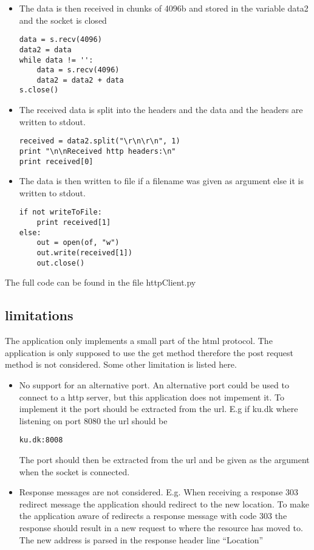\documentclass[a4paper,12pt,danish]{dnacm} %
\begin{document}
\begin{itemize}
  \item The data is then received in chunks of 4096b and stored in the variable
  data2 and the socket is closed
\begin{lstlisting}
data = s.recv(4096)
data2 = data
while data != '':
	data = s.recv(4096)
	data2 = data2 + data
s.close()
\end{lstlisting}  
  \item The received data is split into the headers and the data and the headers
  are written to stdout.
\begin{lstlisting}
received = data2.split("\r\n\r\n", 1)
print "\n\nReceived http headers:\n"
print received[0]
\end{lstlisting}  
  \item The data is then written to file if a filename was given as argument else
  it is written to stdout.
\begin{lstlisting}
if not writeToFile:
	print received[1]
else:
	out = open(of, "w")
	out.write(received[1])
	out.close()
\end{lstlisting}  
\end{itemize}

The full code can be found in the file httpClient.py
\subsection{limitations}
The application only implements a small part of the html protocol. The
application is only supposed to use the get method therefore the post request
method is not considered. Some other limitation is listed here.
\begin{itemize}
  \item No support for an alternative port. An alternative port could be used to
  connect to a http server, but this application does not impement it. To
  implement it the port should be extracted from the url. E.g if ku.dk where
  listening on port 8080 the url should be
\begin{lstlisting}
ku.dk:8008
\end{lstlisting}
The port should then be extracted from the url and be given as the argument when
the socket is connected.
\item Response messages are not considered. E.g. When receiving a response 303
redirect message the application should redirect to the new location. To make
the application aware of redirects a response message with code 303 the
response should result in a new request to where the resource has moved to.
The new address is parsed in the response header line ``Location''
\end{itemize}
\end{document}
